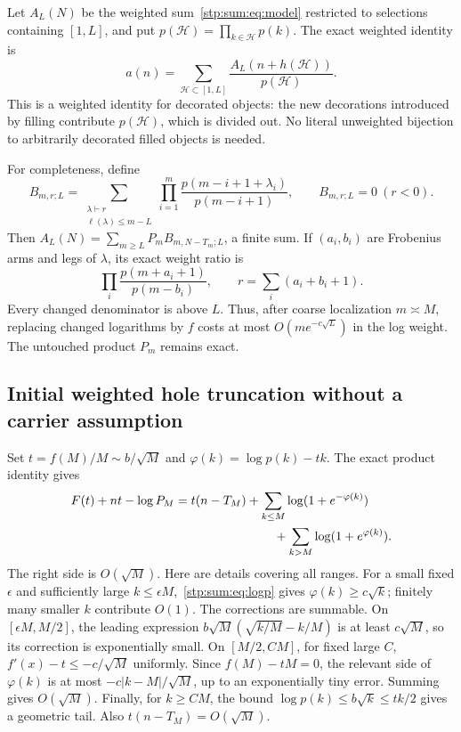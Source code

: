 \documentclass[11pt]{article}
\theoremstyle{remark}\newtheorem{remark}[theorem]{Remark}
\newcommand{\cH}{\mathcal H}
\begin{document}
Let $A_L(N)$ be the weighted sum~\eqref{stp:sum:eq:model} restricted to selections containing $[1,L]$, and put $p(\cH)=\prod_{k\in\cH}p(k)$. The exact weighted identity is
\begin{equation}\label{stp:sum:eq:convolution}
 a(n)=\sum_{\cH\subset[1,L]}\frac{A_L(n+h(\cH))}{p(\cH)}.
\end{equation}
This is a weighted identity for decorated objects: the new decorations introduced by filling contribute $p(\cH)$, which is divided out. No literal unweighted bijection to arbitrarily decorated filled objects is needed.

For completeness, define
\[
 B_{m,r;L}=\sum_{\substack{\lambda\vdash r\\\ell(\lambda)\le m-L}}
 \prod_{i=1}^m\frac{p(m-i+1+\lambda_i)}{p(m-i+1)},
 \qquad B_{m,r;L}=0\ (r<0).
\]
Then $A_L(N)=\sum_{m\ge L}P_mB_{m,N-T_m;L}$, a finite sum. If $(a_i,b_i)$ are Frobenius arms and legs of $\lambda$, its exact weight ratio is
\begin{equation}\label{stp:sum:eq:hooks}
 \prod_i\frac{p(m+a_i+1)}{p(m-b_i)},\qquad
 r=\sum_i(a_i+b_i+1).
\end{equation}
Every changed denominator is above $L$. Thus, after coarse localization $m\asymp M$, replacing changed logarithms by $f$ costs at most $O(m e^{-c\sqrt L})$ in the log weight. The untouched product $P_m$ remains exact.

\subsection{Initial weighted hole truncation without a carrier assumption}
\label{stp:sum:sub:initialtail}
Set $t=f(M)/M\sim b/\sqrt M$ and $\varphi(k)=\log p(k)-tk$. The exact product identity gives
\begin{align}
 F(t)+nt-\log P_M
 &=t(n-T_M)+\sum_{k\le M}\log(1+e^{-\varphi(k)})\notag\\
 &\hspace{28mm}+\sum_{k>M}\log(1+e^{\varphi(k)}).
 \label{stp:sum:eq:physical}
\end{align}
The right side is $O(\sqrt M)$. Here are details covering all ranges. For a small fixed $\epsilon$ and sufficiently large $k\le\epsilon M$,~\eqref{stp:sum:eq:logp} gives $\varphi(k)\ge c\sqrt k$; finitely many smaller $k$ contribute $O(1)$. The corrections are summable. On $[\epsilon M,M/2]$, the leading expression $b\sqrt M(\sqrt{k/M}-k/M)$ is at least $c\sqrt M$, so its correction is exponentially small. On $[M/2,CM]$, for fixed large $C$, $f'(x)-t\le-c/\sqrt M$ uniformly. Since $f(M)-tM=0$, the relevant side of $\varphi(k)$ is at most $-c|k-M|/\sqrt M$, up to an exponentially tiny error. Summing gives $O(\sqrt M)$. Finally, for $k\ge CM$, the bound $\log p(k)\le b\sqrt k\le tk/2$ gives a geometric tail. Also $t(n-T_M)=O(\sqrt M)$.
\end{document}
